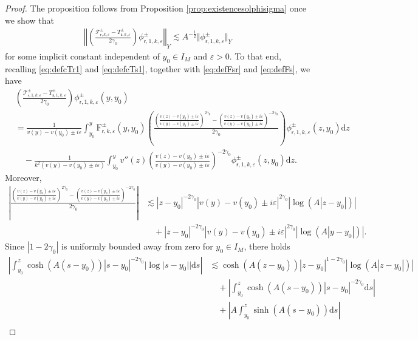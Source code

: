 \documentclass[11pt,reqno]{amsproc}
\theoremstyle{definition}
\numberwithin{equation}{section}
\newcommand{\sr}{{\mathsf{r}}}
\newcommand{\s}{{\mathsf{s}}}
\newcommand{\cT}{{\mathcal T}}
\renewcommand{\d}{\mathrm{d}}
\newcommand{\ep}{\varepsilon}
\begin{document}
\begin{proof}
The proposition follows from Proposition \ref{prop:existencesolphisigma} once we show that
\begin{align*}
\left \Vert \left(\frac{\cT_{\sr,k,\ep}^\pm-T_{\s,k,\ep}^\pm}{2\gamma_0} \right)\phi_{\sr,1,k,\ep}^\pm \right\Vert_Y \lesssim A^{-\frac12}\Vert \phi_{\sr,1,k,\ep}^\pm \Vert_Y
\end{align*}
for some implicit constant independent of $y_0\in I_M$ and $\ep>0$. To that end, recalling \eqref{eq:defcTr1} and \eqref{eq:defcTs1}, together with \eqref{eq:defFsr} and \eqref{eq:defFs}, we have
\begin{equation}\label{eq:cTrminuscTs}
\begin{split}
&\left(\frac{\cT_{\sr,1,k,\ep}^\pm-T_{\s,1,k,\ep}^\pm}{2\gamma_0} \right)\phi_{\sr,1,k,\ep}^\pm(y,y_0) \\
&=  \frac{1}{v(y) - v(y_0) \pm i\ep}\int_{y_0}^y \mathrm{F}_{\sr,k,\ep}^\pm(y,y_0)  \left(\frac{\left( \frac{v(z) - v(y_0) \pm i\ep}{v(y) - v(y_0) \pm i\ep} \right)^{2\gamma_0} -\left( \frac{v(z) - v(y_0) \pm i\ep}{v(y) - v(y_0) \pm i\ep} \right)^{-2\gamma_0}}{2\gamma_0} \right) \phi_{\sr,1,k,\ep}^\pm(z,y_0) \d z \\
&\quad -\frac{1}{k^2(v(y) - v(y_0) \pm i\ep)}\int_{y_0}^y v''(z) \left( \frac{v(z) - v(y_0) \pm i\ep}{v(y) - v(y_0) \pm i\ep} \right)^{-2\gamma_0}\phi_{\sr,1,k,\ep}^\pm(z,y_0) \d z.
\end{split}
\end{equation}
Moreover, 
\begin{align*}
\left| \frac{\left( \frac{v(z) - v(y_0) \pm i\ep}{v(y) - v(y_0) \pm i\ep} \right)^{2\gamma_0} -\left( \frac{v(z) - v(y_0) \pm i\ep}{v(y) - v(y_0) \pm i\ep} \right)^{-2\gamma_0}}{2\gamma_0} \right| &\lesssim |z-y_0|^{-2\gamma_0}|v(y) - v(y_0) \pm i\ep|^{2\gamma_0} | \log (A |z-y_0|) | \\
&\quad +|z-y_0|^{-2\gamma_0}|v(y) - v(y_0) \pm i\ep|^{2\gamma_0} | \log (A | y-y_0|) |.
\end{align*}
Since $|1-2\gamma_0|$ is uniformly bounded away from zero for $y_0\in I_M$, there holds
\begin{align*}
\left| \int_{y_0}^z \cosh(A(s-y_0)) |s-y_0|^{-2\gamma_0} | \log |s-y_0| | \d s \right| &\lesssim  \cosh(A(z-y_0))|z-y_0|^{1-2\gamma_0}|\log(A|z-y_0|)| \\
&\quad+  \left| \int_{y_0}^z \cosh(A(s-y_0))|s-y_0|^{-2\gamma_0} \d s \right| \\
&\quad + \left| A\int_{y_0}^z \sinh(A(s-y_0)) \d s \right| \\

\end{align*}
\end{proof}
\end{document}
